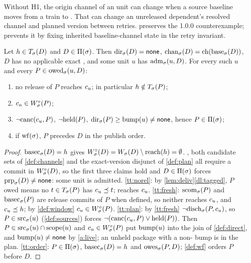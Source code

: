 \begin{remark}
\label{rem:origin-drift}
Without H1, the origin channel of an  unit can change when a
source baseline moves from a train to \stable{}. That can change an unreleased
dependent's resolved channel and planned version between retries.
 preserves the 1.0.0 counterexample; \SPEC{} prevents it by
fixing inherited baseline-channel state in the retry invariant.
\end{remark}

\begin{lemma}
\label{lem:tagged-target}
Let $h \in T_{\sigma}(D)$ and $D \in \Pi(\sigma)$. Then $\mathrm{dir}_{\sigma}(D) =
\mathsf{none}$, $\mathrm{chan}_{\sigma}(D) = \mathrm{ch}(\mathrm{base}_{\sigma}(D))$, $D$ has no applicable
exact , and some unit $u$ has $\mathrm{adm}_{\sigma}(u,D)$. For every
such $u$ and every $P \in \mathrm{owed}_{\sigma}(u,D)$:
\begin{enumerate}[label=(\roman*),leftmargin=2.4em]
  \item no release of $P$ reaches $c_{u}$; in particular $h \notin
    T_{\sigma}(P)$; \label{tt:norel}
  \item $c_{u} \in W^{\circ}_{\sigma}(P)$; \label{tt:fresh}
  \item $\lnot\mathrm{canc}(c_{u},P)$, $\lnot\mathrm{held}(P)$, $\mathrm{dir}_{\sigma}(P) \geq
    \mathrm{bump}(u) \neq \mathsf{none}$, hence $P \in \Pi(\sigma)$; \label{tt:plan}
  \item if $\mathrm{wf}(\sigma)$, $P$ precedes $D$ in the publish order. \label{tt:order}
\end{enumerate}
\end{lemma}

\begin{proof}
$\mathrm{basec}_{\sigma}(D) = h$ gives $W^{\circ}_{\sigma}(D) = W_{\sigma}(D)\setminus\mathrm{reach}(h)
= \emptyset$. , both candidate sets of \cref{def:channels}
and the exact-version disjunct of \cref{def:plan} all require a commit in
$W^{\circ}_{\sigma}(D)$, so the first three claims hold and $D \in \Pi(\sigma)$ forces
$\mathrm{prp}_{\sigma}(D) \neq \mathsf{none}$: some unit is admitted.
\ref{tt:norel}: by \cref{lem:deliv}\ref{dl:tagged}, $P$ owed means no $t \in
T_{\sigma}(P)$ has $c_{u} \preceq t$; \Head{} reaches $c_{u}$.
\ref{tt:fresh}: $\mathrm{scom}_{\sigma}(P)$ and $\mathrm{basec}_{\sigma}(P)$ are release commits
of $P$ when defined, so neither reaches $c_{u}$, and $c_{u} \preceq h$;
by \cref{def:window} $c_{u} \in W^{\circ}_{\sigma}(P)$.
\ref{tt:plan}: by \ref{tt:fresh} $\lnot\mathrm{disch}_{\sigma}(P,c_{u})$, so $P \in
\mathrm{src}_{\sigma}(u)$ (\cref{def:sources}) forces $\lnot(\mathrm{canc}(c_{u},P) \lor
\mathrm{held}(P))$. Then $P \in \mathrm{src}_{\sigma}(u) \cap \mathrm{scope}(u)$ and $c_{u} \in
W^{\circ}_{\sigma}(P)$ put $\mathrm{bump}(u)$ into the join of \cref{def:direct}, and
$\mathrm{bump}(u) \neq \mathsf{none}$ by \cref{a:live}; an unheld package with a non-\bnone{}
bump is in the plan.
\ref{tt:order}: $P \in \Pi(\sigma)$, $\mathrm{basec}_{\sigma}(D) = h$ and
$\mathrm{owes}_{\sigma}(P,D)$; \cref{def:wf} orders $P$ before $D$.
\end{proof}

